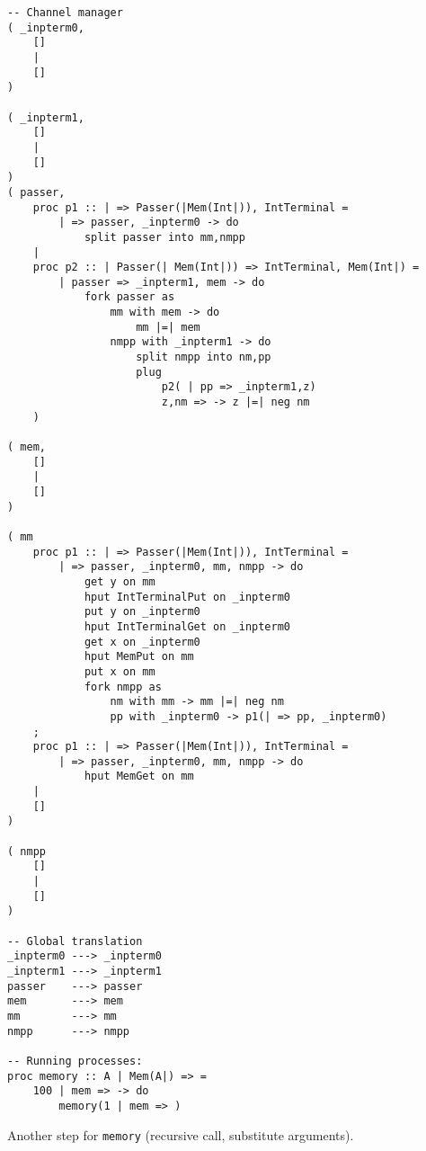 \documentclass{article}
\theoremstyle{plain}%
\theoremstyle{definition}
\theoremstyle{remark}
\begin{document}
\begin{verbatim}
-- Channel manager
( _inpterm0,  
    []
    |
    []
)

( _inpterm1,  
    []
    |
    []
)
( passer,
    proc p1 :: | => Passer(|Mem(Int|)), IntTerminal = 
        | => passer, _inpterm0 -> do
            split passer into mm,nmpp 
    |
    proc p2 :: | Passer(| Mem(Int|)) => IntTerminal, Mem(Int|) =
        | passer => _inpterm1, mem -> do
            fork passer as
                mm with mem -> do
                    mm |=| mem
                nmpp with _inpterm1 -> do
                    split nmpp into nm,pp
                    plug
                        p2( | pp => _inpterm1,z)
                        z,nm => -> z |=| neg nm
    )

( mem,
    []
    |
    []
)

( mm
    proc p1 :: | => Passer(|Mem(Int|)), IntTerminal = 
        | => passer, _inpterm0, mm, nmpp -> do
            get y on mm
            hput IntTerminalPut on _inpterm0
            put y on _inpterm0
            hput IntTerminalGet on _inpterm0
            get x on _inpterm0
            hput MemPut on mm
            put x on mm
            fork nmpp as
                nm with mm -> mm |=| neg nm 
                pp with _inpterm0 -> p1(| => pp, _inpterm0)
    ;
    proc p1 :: | => Passer(|Mem(Int|)), IntTerminal = 
        | => passer, _inpterm0, mm, nmpp -> do
            hput MemGet on mm 
    |
    []
)

( nmpp
    []
    |
    []
)

-- Global translation
_inpterm0 ---> _inpterm0 
_inpterm1 ---> _inpterm1 
passer    ---> passer 
mem       ---> mem
mm        ---> mm
nmpp      ---> nmpp

-- Running processes:
proc memory :: A | Mem(A|) => =
    100 | mem => -> do
        memory(1 | mem => )
\end{verbatim}
Another step for \verb|memory| (recursive call, substitute arguments).
\end{document}

